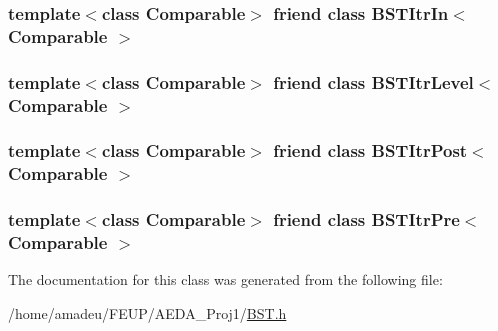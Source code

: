 \subsubsection[{\texorpdfstring{B\+S\+T\+Itr\+In$<$ Comparable $>$}{BSTItrIn< Comparable >}}]{\setlength{\rightskip}{0pt plus 5cm}template$<$class Comparable$>$ friend class {\bf B\+S\+T\+Itr\+In}$<$ Comparable $>$\hspace{0.3cm}{\ttfamily [friend]}}\hypertarget{classBinaryNode_aab3993acac2ab24a0b59edb0c3acc775}{}\label{classBinaryNode_aab3993acac2ab24a0b59edb0c3acc775}
\subsubsection[{\texorpdfstring{B\+S\+T\+Itr\+Level$<$ Comparable $>$}{BSTItrLevel< Comparable >}}]{\setlength{\rightskip}{0pt plus 5cm}template$<$class Comparable$>$ friend class {\bf B\+S\+T\+Itr\+Level}$<$ Comparable $>$\hspace{0.3cm}{\ttfamily [friend]}}\hypertarget{classBinaryNode_a26ff00bc0d87069aed877f10fd3c80a8}{}\label{classBinaryNode_a26ff00bc0d87069aed877f10fd3c80a8}
\subsubsection[{\texorpdfstring{B\+S\+T\+Itr\+Post$<$ Comparable $>$}{BSTItrPost< Comparable >}}]{\setlength{\rightskip}{0pt plus 5cm}template$<$class Comparable$>$ friend class {\bf B\+S\+T\+Itr\+Post}$<$ Comparable $>$\hspace{0.3cm}{\ttfamily [friend]}}\hypertarget{classBinaryNode_a5dc153694be266f6e772659486219da7}{}\label{classBinaryNode_a5dc153694be266f6e772659486219da7}
\subsubsection[{\texorpdfstring{B\+S\+T\+Itr\+Pre$<$ Comparable $>$}{BSTItrPre< Comparable >}}]{\setlength{\rightskip}{0pt plus 5cm}template$<$class Comparable$>$ friend class {\bf B\+S\+T\+Itr\+Pre}$<$ Comparable $>$\hspace{0.3cm}{\ttfamily [friend]}}\hypertarget{classBinaryNode_a45a55df6f11541416d4ea7684c575c1a}{}\label{classBinaryNode_a45a55df6f11541416d4ea7684c575c1a}


The documentation for this class was generated from the following file\+:\begin{DoxyCompactItemize}
\item 
/home/amadeu/\+F\+E\+U\+P/\+A\+E\+D\+A\+\_\+\+Proj1/\hyperlink{BST_8h}{B\+S\+T.\+h}\end{DoxyCompactItemize}
